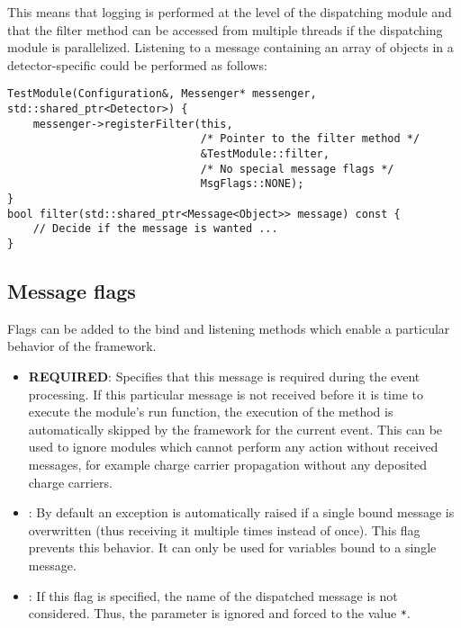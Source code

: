 \begin{enumerate}
This means that logging is performed at the level of the dispatching module and that the filter method can be accessed from multiple threads if the dispatching module is parallelized.
Listening to a message containing an array of objects in a detector-specific  could be performed as follows:
\begin{verbatim}
TestModule(Configuration&, Messenger* messenger, std::shared_ptr<Detector>) {
    messenger->registerFilter(this,
                              /* Pointer to the filter method */
                              &TestModule::filter,
                              /* No special message flags */
                              MsgFlags::NONE);
}
bool filter(std::shared_ptr<Message<Object>> message) const {
    // Decide if the message is wanted ...
}
\end{verbatim}
\end{enumerate}

\subsection{Message flags}
\label{sec:messageflags}
Flags can be added to the bind and listening methods which enable a particular behavior of the framework.
\begin{itemize}
    \item \textbf{REQUIRED}: Specifies that this message is required during the event processing.
    If this particular message is not received before it is time to execute the module's run function, the execution of the method is automatically skipped by the framework for the current event.
    This can be used to ignore modules which cannot perform any action without received messages, for example charge carrier propagation without any deposited charge carriers.
    \item {}: By default an exception is automatically raised if a single bound message is overwritten (thus receiving it multiple times instead of once).
    This flag prevents this behavior.
    It can only be used for variables bound to a single message.
    \item {}: If this flag is specified, the name of the dispatched message is not considered.
    Thus, the  parameter is ignored and forced to the value \texttt{*}.
\end{itemize}

